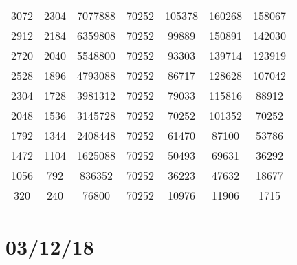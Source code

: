 \documentclass[11pt,a4paper]{report}
\begin{document}
\begin{itemize}
\begin{itemize}
\begin{itemize}
\begin{center}
\begin{tabular}{ c c c | c c c c }
            3072 & 2304 & 7077888 & 70252 & 105378 & 160268 & 158067 \\
            2912 & 2184 & 6359808 & 70252 & 99889 & 150891 & 142030 \\
            2720 & 2040 & 5548800 & 70252 & 93303 & 139714 & 123919 \\
            2528 & 1896 & 4793088 & 70252 & 86717 & 128628 & 107042 \\
            2304 & 1728 & 3981312 & 70252 & 79033 & 115816 & 88912 \\
            2048 & 1536 & 3145728 & 70252 & 70252 & 101352 & 70252 \\
            1792 & 1344 & 2408448 & 70252 & 61470 & 87100 & 53786 \\
            1472 & 1104 & 1625088 & 70252 & 50493 & 69631 & 36292 \\
            1056 & 792 & 836352 & 70252 & 36223 & 47632 & 18677 \\
            320 & 240 & 76800 & 70252 & 10976 & 11906 & 1715 \\
            \end{tabular}
          \end{center}
        \end{itemize}
    \end{itemize}

\end{itemize}

\section{03/12/18}
\end{document}
